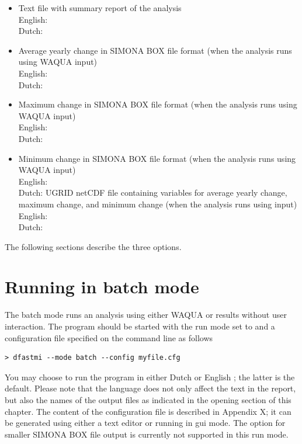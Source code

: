 \begin{itemize}
\item Text file with summary report of the analysis \\
English:  \\
Dutch: 
\item Average yearly change in SIMONA BOX file format (when the analysis runs using WAQUA input) \\
English:  \\
Dutch: 
\item Maximum change in SIMONA BOX file format (when the analysis runs using WAQUA input) \\
English:  \\
Dutch: 
\item Minimum change in SIMONA BOX file format (when the analysis runs using WAQUA input) \\
English:  \\
Dutch: 
UGRID netCDF file containing variables for average yearly change, maximum change, and minimum change (when the analysis runs using \dflowfm input) \\
English:  \\
Dutch: 
\end{itemize}

The following sections describe the three options.

\section{Running in batch mode}

The batch mode runs an analysis using either WAQUA or \dflowfm results without user interaction.
The program should be started with the run mode set to  and a configuration file specified on the command line as follows

\begin{Verbatim}
> dfastmi --mode batch --config myfile.cfg
\end{Verbatim}

You may choose to run the program in either Dutch  or English ; the latter is the default.
Please note that the language does not only affect the text in the report, but also the names of the output files as indicated in the opening section of this chapter.
The content of the configuration file is described in Appendix X; it can be generated using either a text editor or \dfastmi running in gui mode.
The  option for smaller SIMONA BOX file output is currently not supported in this run mode.

